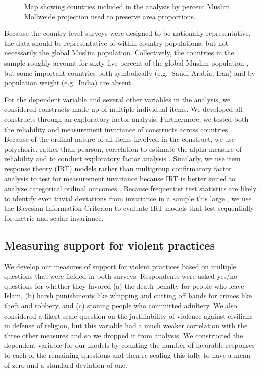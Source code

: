 \documentclass[10pt,letterpaper]{article}
\begin{document}
\begin{figure}[!h]
\centering
\caption{Map showing countries included in the analysis by percent
Muslim. Mollweide projection used to preserve area proportions.}
\label{fig:figure-world-map}
\end{figure}

Because the country-level surveys were designed to be nationally representative, the data should be representative of within-country populations, but not necessarily the global Muslim population. Collectively, the countries in the sample roughly account for sixty-five percent of the global Muslim population \cite{pewforumonreligionandpubliclife_global_2012}, but some important countries both symbolically (e.g.~Saudi Arabia, Iran) and by population weight (e.g.~India) are absent.

For the dependent variable and several other variables in the analysis, we considered constructs made up of multiple individual items. We developed all constructs through an exploratory factor analysis. Furthermore, we tested both the reliability and measurement invariance of constructs across countries \cite{vandevijver_methods_2021}. Because of the ordinal nature of all items involved in the construct, we use polychoric, rather than pearson, correlation to estimate the alpha measure of reliability and to conduct exploratory factor analysis \cite{gadermann_estimating_2012}. Similarly, we use item response theory (IRT) models rather than multigroup confirmatory factor analysis to test for measurement invariance because IRT is better suited to analyze categorical ordinal outcomes \cite{tay_overview_2015}. Because frequentist test statistics are likely to identify even trivial deviations from invariance in a sample this large \cite[p.~106]{vandevijver_methods_2021}, we use the Bayesian Information Criterion to evaluate IRT models that test sequentially for metric and scalar invariance.

\subsection*{Measuring support for violent practices}

We develop our measures of support for violent practices based on multiple questions that were fielded in both surveys. Respondents were asked yes/no questions for whether they favored (a) the death penalty for people who leave Islam, (b) harsh punishments like whipping and cutting off hands for crimes like theft and robbery, and (c) stoning people who committed adultery. We also considered a likert-scale question on the justifiability of violence against civilians in defense of religion, but this variable had a much weaker correlation with the three other measures and so we dropped it from analysis. We constructed the dependent variable for our models by counting the number of favorable responses to each of the remaining questions and then re-scaling this tally to have a mean of zero and a standard deviation of one.
\end{document}
